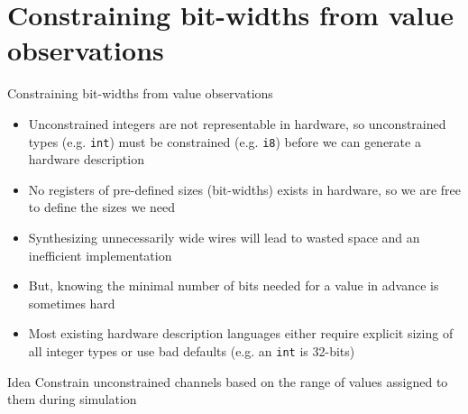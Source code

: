 \documentclass{beamer}
\begin{document}

\section{Constraining bit-widths from value observations}

\begin{frame}[shrink]{Constraining bit-widths from value observations}

  \begin{itemize}
  \item Unconstrained integers are not representable in hardware, so
    unconstrained types (e.g. {\tt int}) must be constrained (e.g. {\tt i8})
    before we can generate a hardware description
  \item No registers of pre-defined sizes (bit-widths) exists in hardware, so we
    are free to define the sizes we need
  \item Synthesizing unnecessarily wide wires will lead to wasted space and an
    inefficient implementation
  \item But, knowing the minimal number of bits needed for a value in advance is
    sometimes hard
  \item Most existing hardware description languages either require
    explicit sizing of all integer types or use bad defaults (e.g. an {\tt int}
    is 32-bits)
  \end{itemize}
  \pause
  \begin{block}{Idea}
    Constrain unconstrained channels based on the range of values assigned to
    them during simulation
  \end{block}
\end{frame}
\end{document}
